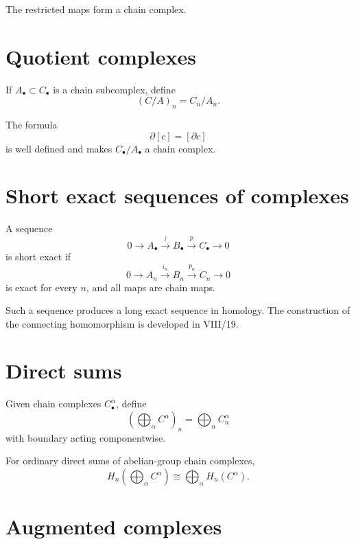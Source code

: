 The restricted maps form a chain complex.

\section{Quotient complexes}

If \(A_\bullet\subset C_\bullet\) is a chain subcomplex, define
\[
(C/A)_n=C_n/A_n.
\]

\begin{proposition}
\label{prop:viii16-quotient}
The formula
\[
\partial[c]=[\partial c]
\]
is well defined and makes \(C_\bullet/A_\bullet\) a chain complex.
\end{proposition}

\section{Short exact sequences of complexes}

\begin{definition}
\label{def:viii16-short-exact}
A sequence
\[
0\to A_\bullet\xrightarrow{i}B_\bullet\xrightarrow{p}C_\bullet\to0
\]
is short exact if
\[
0\to A_n\xrightarrow{i_n}B_n\xrightarrow{p_n}C_n\to0
\]
is exact for every \(n\), and all maps are chain maps.
\end{definition}

Such a sequence produces a long exact sequence in homology.  The construction
of the connecting homomorphism is developed in VIII/19.

\section{Direct sums}

Given chain complexes \(C^\alpha_\bullet\), define
\[
\left(\bigoplus_\alpha C^\alpha\right)_n
=
\bigoplus_\alpha C^\alpha_n
\]
with boundary acting componentwise.

\begin{proposition}
\label{prop:viii16-direct-sum}
For ordinary direct sums of abelian-group chain complexes,
\[
H_n\left(\bigoplus_\alpha C^\alpha\right)
\cong
\bigoplus_\alpha H_n(C^\alpha).
\]
\end{proposition}

\section{Augmented complexes}

